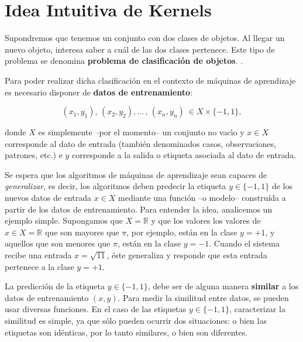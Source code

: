 \section{Idea Intuitiva de Kernels}
Supondremos que tenemos un conjunto con dos clases de objetos.
Al llegar un nuevo objeto, interesa saber a cu\'al de
las dos clases pertenece.
Este tipo de problema se denomina
{\bf problema de clasificaci\'on de objetos}. \cite{smola}.

Para poder realizar dicha clasificaci\'on en el contexto de m\'aquinas de
aprendizaje es necesario disponer de {\bf datos de entrenamiento}:

$$
(x_1,y_1),\,(x_2,y_2),\dots\,,\,(x_n,y_n)\ \in X\times\{-1,1\},
$$

\noindent donde $X$ es simplemente --por el momento-- un conjunto no vac\'\i o
y $x\in X$ corresponde al dato de entrada (tambi\'en denominados casos,
observaciones, patrones, etc.) e $y$ corresponde a la salida o etiqueta
asociada al dato de entrada.


Se espera que los algoritmos de m\'aquinas de  aprendizaje sean capaces de \emph{generalizar}, es decir,
los algoritmos deben predecir la etiqueta $y \in \{-1,1\}$
de los nuevos datos de entrada $x \in X$  mediante una funci\'on --o modelo-- constru\'ida
a partir de los datos de entrenamiento.
Para entender la idea, analicemos un ejemplo simple.
Supongamos que $X=\mathbb{R}$  y que los valores los valores de $x\in X=\mathbb{R}$ que son
mayores que $\pi$, por ejemplo, est\'an en la clase $y=+1$, y aquellos que son menores que $\pi$, est\'an en la clase $y=-1$.
Cuando el sistema recibe una entrada $x=\sqrt{11}$, \'este generaliza y responde que esta entrada pertenece a la clase $y=+1$.



La predicci\'on de la etiqueta $y\in\{-1,1\}$, debe ser de alguna manera
\textbf{similar} a los datos de entrenamiento $(x,y)$.
%
Para medir la similitud entre datos, se pueden usar diversas funciones.
En el caso de las etiquetas $y\in\{-1,1\}$, caracterizar la similitud es
simple, ya que s\'olo pueden ocurrir dos situaciones:
o bien las etiquetas son id\'enticas, por lo tanto similares,  o  bien son diferentes.




